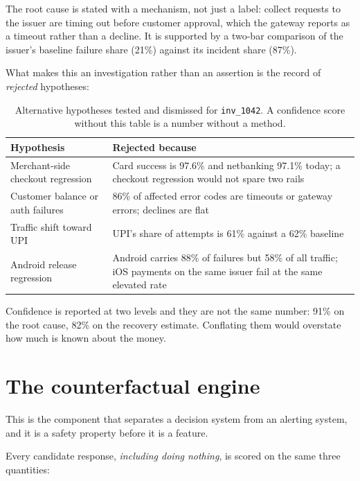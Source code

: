 \documentclass[10pt,twocolumn,a4paper]{article}
\newcommand{\code}[1]{\texttt{\small #1}}
\begin{document}
The root cause is stated with a mechanism, not just a label: collect requests to
the issuer are timing out before customer approval, which the gateway reports as
a timeout rather than a decline. It is supported by a two-bar comparison of the
issuer's baseline failure share (21\%) against its incident share (87\%).

What makes this an investigation rather than an assertion is the record of
\emph{rejected} hypotheses:

\begin{table}[h]
\centering
\small
\begin{tabular}{@{}p{} p{}@{}}
\toprule
\textbf{Hypothesis} & \textbf{Rejected because} \\
\midrule
Merchant-side checkout regression & Card success is 97.6\% and netbanking 97.1\% today; a checkout regression would not spare two rails \\
Customer balance or auth failures & 86\% of affected error codes are timeouts or gateway errors; declines are flat \\
Traffic shift toward UPI & UPI's share of attempts is 61\% against a 62\% baseline \\
Android release regression & Android carries 88\% of failures but 58\% of all traffic; iOS payments on the same issuer fail at the same elevated rate \\
\bottomrule
\end{tabular}
\caption{Alternative hypotheses tested and dismissed for \code{inv\_1042}. A
confidence score without this table is a number without a method.}
\end{table}

Confidence is reported at two levels and they are not the same number: 91\% on
the root cause, 82\% on the recovery estimate. Conflating them would overstate
how much is known about the money.

\section{The counterfactual engine}
\label{sec:cf}

This is the component that separates a decision system from an alerting system,
and it is a safety property before it is a feature.

Every candidate response, \emph{including doing nothing}, is scored on the same
three quantities:
\end{document}
